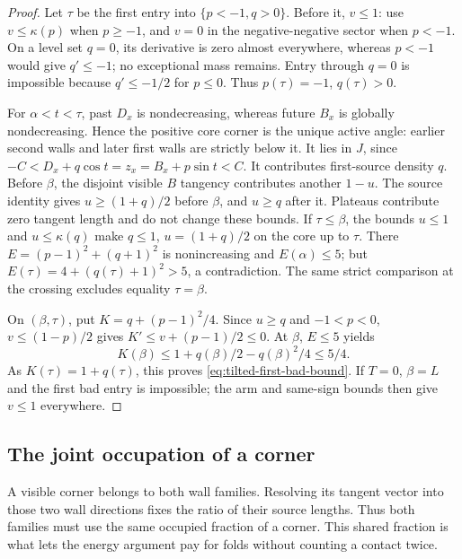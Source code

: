 \begin{proof}
Let $\tau$ be the first entry into $\{p<-1,q>0\}$.
Before it, $v\le1$: use $v\le\kappa(p)$ when $p\ge-1$,
and $v=0$ in the negative-negative sector when $p<-1$.
On a level set $q=0$, its derivative is zero almost everywhere,
whereas $p<-1$ would give $q'\le-1$; no exceptional mass remains.
Entry through $q=0$ is impossible because $q'\le-1/2$ for
$p\le0$. Thus $p(\tau)=-1$, $q(\tau)>0$.

For $\alpha<t<\tau$, past $D_x$ is nondecreasing, whereas
future $B_x$ is globally nondecreasing. Hence the positive core
corner is the unique active angle: earlier second walls and
later first walls are strictly below it. It lies in $J$, since
$-C<D_x+q\cos t=z_x=B_x+p\sin t<C$.
It contributes first-source density $q$. Before $\beta$,
the disjoint visible $B$ tangency contributes another $1-u$.
The source identity gives
$u\ge(1+q)/2$ before $\beta$, and $u\ge q$ after it.
Plateaus contribute zero tangent length and do not change these
bounds. If $\tau\le\beta$, the bounds $u\le1$ and
$u\le\kappa(q)$ make $q\le1$, $u=(1+q)/2$ on the core
up to $\tau$. There
$E=(p-1)^2+(q+1)^2$ is nonincreasing and $E(\alpha)\le5$;
but $E(\tau)=4+(q(\tau)+1)^2>5$, a contradiction.
The same strict comparison at the crossing excludes equality
$\tau=\beta$.

On $(\beta,\tau)$, put $K=q+(p-1)^2/4$.
Since $u\ge q$ and $-1<p<0$, $v\le(1-p)/2$ gives
$K'\le v+(p-1)/2\le0$.
At $\beta$, $E\le5$ yields
\[
 K(\beta)\le1+q(\beta)/2-q(\beta)^2/4\le5/4.
\]
As $K(\tau)=1+q(\tau)$, this proves
\cref{eq:tilted-first-bad-bound}. If $T=0$, $\beta=L$ and
the first bad entry is impossible; the arm and same-sign
bounds then give $v\le1$ everywhere.
\end{proof}

\subsection{The joint occupation of a corner}

A visible corner belongs to both wall families. Resolving its tangent
vector into those two wall directions fixes the ratio of their source
lengths. Thus both families must use the same occupied fraction of a
corner. This shared fraction is what lets the energy argument pay for
folds without counting a contact twice.

